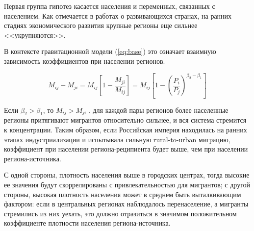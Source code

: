 \documentclass[a4paper,12pt]{article}
\begin{document}

Первая группа гипотез касается населения и переменных, связанных с населением. Как отмечается в работах о развивающихся странах, на ранних стадиях экономического развития крупные регионы еще сильнее <<укрупняются>>.


В контексте гравитационной модели (\ref{eq:base}) это означает взаимную зависимость коэффициентов при населении регионов.

\begin{equation}\label{eq:comeback}
	M_{ij} - M_{ji} = M_{ij} \left[ 1 - \frac{M_{ji}}{M_{ij}} \right] = M_{ij} \left[ 1 - \left( \frac{P_i}{P_j} \right)^{\beta_2 - \beta_1} \right]
\end{equation}

Если $\beta_2 > \beta_1$, то $M_{ij} > M_{ji}$ \citep{poot_gravity_2016}, для каждой пары регионов более населенные регионы притягивают мигрантов относительно сильнее, и вся система стремится к концентрации. Таким образом, если Российская империя находилась на ранних этапах индустриализации и испытывала сильную rural-to-urban миграцию, коэффициент при населении региона-реципиента будет выше, чем при населении региона-источника.

С одной стороны, плотность населения выше в городских центрах, тогда высокие ее значения будут скоррелированы с привлекательностью для мигрантов; с другой стороны, высокая плотность населения может в среднем быть выталкивающим фактором: если в центральных регионах наблюдалось перенаселение, а мигранты стремились из них уехать, это должно отразиться в значимом положительном коэффициенте плотности населения региона-источника.
\end{document}
